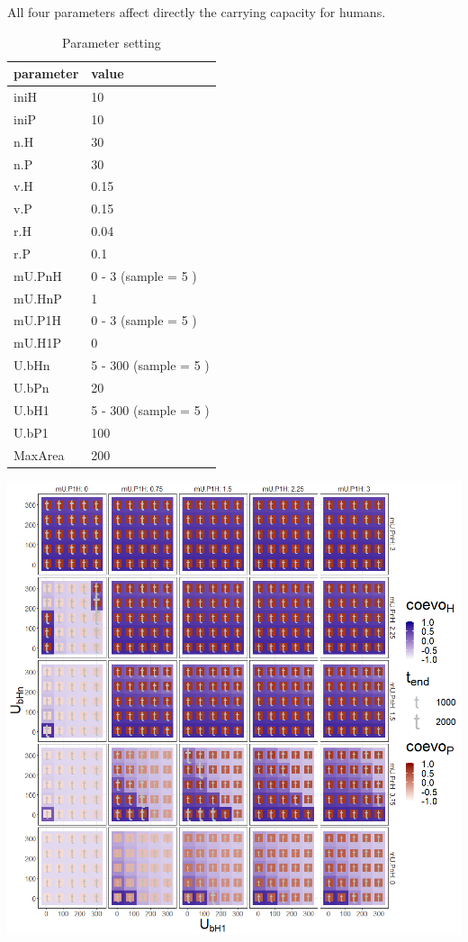 \documentclass[]{book}
\begin{document}

All four parameters affect directly the carrying capacity for humans.

\begin{table}[!h]

\caption{\label{tab:4UbHUPHtablepdf}Parameter setting}
\centering
\begin{tabular}{l|l}
\hline
parameter & value\\
\hline
iniH & 10\\
\hline
iniP & 10\\
\hline
n.H & 30\\
\hline
n.P & 30\\
\hline
v.H & 0.15\\
\hline
v.P & 0.15\\
\hline
r.H & 0.04\\
\hline
r.P & 0.1\\
\hline
mU.PnH & 0 - 3 (sample = 5 )\\
\hline
mU.HnP & 1\\
\hline
mU.P1H & 0 - 3 (sample = 5 )\\
\hline
mU.H1P & 0\\
\hline
U.bHn & 5 - 300 (sample = 5 )\\
\hline
U.bPn & 20\\
\hline
U.bH1 & 5 - 300 (sample = 5 )\\
\hline
U.bP1 & 100\\
\hline
MaxArea & 200\\
\hline
\end{tabular}
\end{table}

\newpage

\includegraphics[width=1\linewidth]{plots/4_fourPar-U.bH-U.PH_plot}
\end{document}
